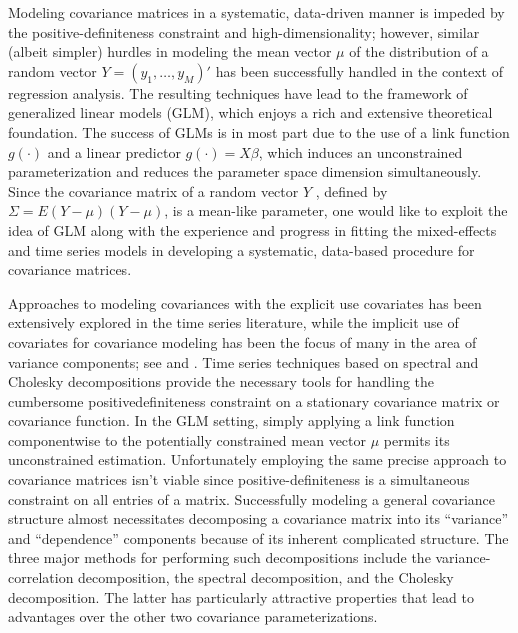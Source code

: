 \documentclass[12pt]{article}
\theoremstyle{definition}
\begin{document}
Modeling covariance matrices in a systematic, data-driven manner is impeded by the positive-definiteness constraint and high-dimensionality; however, similar (albeit simpler) hurdles in modeling the mean vector $\mu$ of the distribution of a random vector $Y = \left(y_1, \dots , y_M\right)'$ has been successfully handled in the context of regression analysis. The resulting techniques have lead to the framework of generalized linear models (GLM), which enjoys a rich and extensive theoretical foundation. The success of GLMs is in most part due to the use of a  link function $g\left(\cdot\right)$ and a linear predictor $g\left(\cdot\right) = X\beta$, which induces an unconstrained parameterization and reduces the parameter space dimension simultaneously. Since the covariance matrix of a random vector $Y$ , defined by $\Sigma = E\left(Y - \mu\right)\left(Y - \mu\right)$, is a mean-like parameter, one would like to exploit the idea of GLM along with the experience and progress in fitting the mixed-effects and time series models in developing a systematic, data-based procedure for covariance matrices. 

\bigskip

Approaches to modeling covariances with the explicit use covariates has been extensively explored in the time series literature, while the implicit use of covariates for covariance modeling has been the focus of many in the area of variance components; see \citet{klein1997statistical} and \citet{searle2009variance}. Time series techniques based on spectral and Cholesky decompositions provide the necessary tools for handling the cumbersome positivedefiniteness constraint on a stationary covariance matrix or covariance function. In the GLM setting, simply  applying a link function componentwise to the potentially constrained mean vector $\mu$ permits its unconstrained estimation. Unfortunately employing the same precise approach to  covariance matrices isn't viable since positive-definiteness is a simultaneous constraint on all entries of a matrix. Successfully modeling a general covariance structure almost necessitates decomposing a covariance matrix into its ``variance'' and ``dependence'' components because of its inherent complicated structure.  The three major methods for performing such decompositions include the variance-correlation decomposition, the spectral decomposition, and the Cholesky decomposition. The latter has particularly attractive properties that lead to advantages over the other two covariance parameterizations. 
\end{document}

